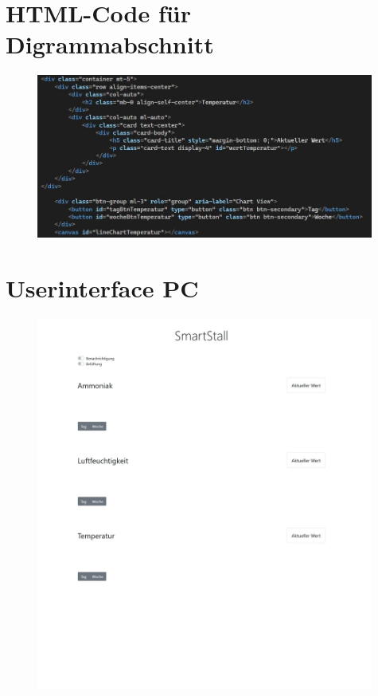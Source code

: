 \documentclass[conference]{IEEEtran}
\begin{document}
\begin{appendices}
\section{HTML-Code für Digrammabschnitt}
\label{sec:htmlCodeDiagrammAnhang}
\begin{figure}[h]
    \centering
    \includegraphics[width=0.99\textwidth]{fig/htmlcode.JPG}
\end{figure}

\clearpage
\section{Userinterface PC}
\label{sec:uiPCAnhang}
\begin{figure}[h]
    \centering
    \includegraphics[width=0.99\textwidth]{fig/uiPC.jpg}
\end{figure}


\end{appendices}
\end{document}
